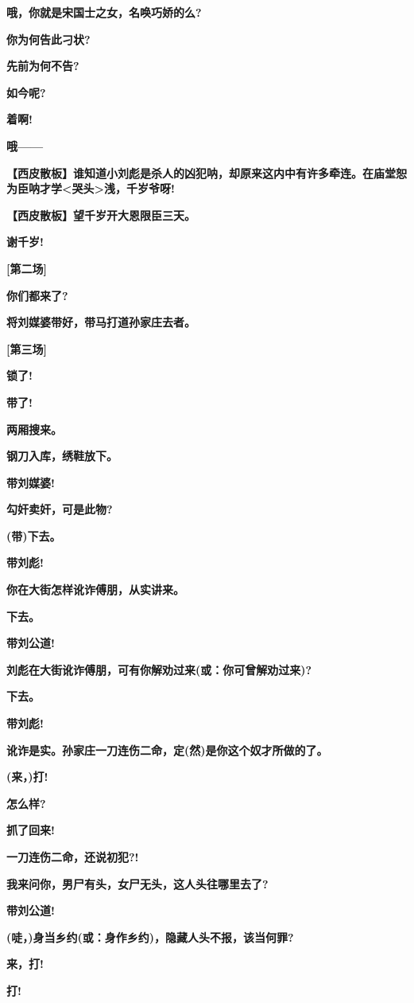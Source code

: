 \textbf{哦，你就是宋国士之女，名唤巧娇的么?}

\textbf{你为何告此刁状?}

\textbf{先前为何不告?}

\textbf{如今呢?}

\textbf{着啊!}

\textbf{哦------}

\textbf{【西皮散板】谁知道小刘彪是杀人的凶犯呐，却原来这内中有许多牵连。在庙堂恕为臣呐才学\textless{}哭头\textgreater{}浅，千岁爷呀!}

\textbf{【西皮散板】望千岁开大恩限臣三天。}

\textbf{谢千岁!}

\textbf{{[}第二场{]}}

\textbf{你们都来了?}

\textbf{将刘媒婆带好，带马打道孙家庄去者。}

\textbf{{[}第三场{]}}

\textbf{锁了!}

\textbf{带了!}

\textbf{两厢搜来。}

\textbf{钢刀入库，绣鞋放下。}

\textbf{带刘媒婆!}

\textbf{勾奸卖奸，可是此物?}

\textbf{(带)下去。}

\textbf{带刘彪!}

\textbf{你在大街怎样讹诈傅朋，从实讲来。}

\textbf{下去。}

\textbf{带刘公道!}

\textbf{刘彪在大街讹诈傅朋，可有你解劝过来(或：你可曾解劝过来)?}

\textbf{下去。}

\textbf{带刘彪!}

\textbf{讹诈是实。孙家庄一刀连伤二命，定(然)是你这个奴才所做的了。}

\textbf{(来，)打!}

\textbf{怎么样?}

\textbf{抓了回来!}

\textbf{一刀连伤二命，还说初犯?!}

\textbf{我来问你，男尸有头，女尸无头，这人头往哪里去了?}

\textbf{带刘公道!}

\textbf{(唗，)身当乡约(或：身作乡约)，隐藏人头不报，该当何罪?}

\textbf{来，打!}

\textbf{打!}

